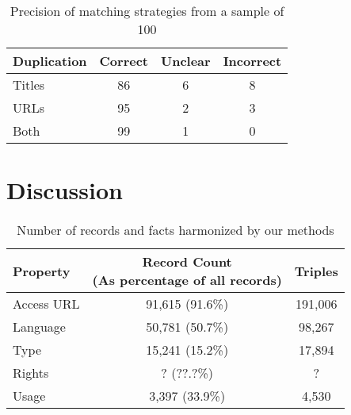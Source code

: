 \documentclass[11pt]{article}
\begin{document}
\begin{table}
    \begin{tabular}{l|ccc}
        Duplication & Correct & Unclear & Incorrect \\
        \hline                    
        Titles      &    86   &   6     &    8      \\ 
        URLs        &    95   &   2     &    3      \\
        Both        &    99   &   1     &    0      \\
    \end{tabular}
    \caption{\label{tab:dupe-precision}Precision of matching strategies from a
    sample of 100}
\end{table}

\section{Discussion}
\label{discussion}

\begin{table}
    \begin{tabular}{l|cc}
        Property   &  \thead{Record Count\\(As percentage of all records)} & Triples \\
        \hline
        Access URL &  91,615 (91.6\%) & 191,006  \\
        Language   &  50,781 (50.7\%) & 98,267   \\
        Type       &  15,241 (15.2\%) & 17,894   \\
        Rights     &       ? (??.?\%) & ?        \\
        Usage      &   3,397 (33.9\%) & 4,530    \\ 
    \end{tabular}
    \caption{\label{tab:total}Number of records and facts harmonized by our
    methods}
\end{table}
        
\end{document}
